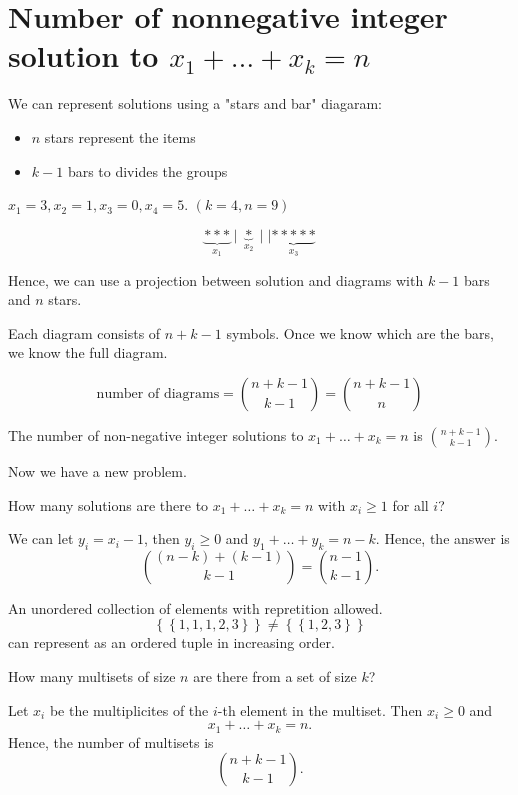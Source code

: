 \section{Number of nonnegative integer solution to \(x_1 + \dots + x_k = n\)}
We can represent solutions using a "stars and bar" diagaram:
\begin{itemize}
    \item \(n\) stars represent the items 
    \item \(k-1\) bars to divides the groups  
\end{itemize}
\begin{eg}
    \(x_1 = 3, x_2 = 1, x_3 = 0, x_4 = 5\). \((k=4, n=9)\)  
\end{eg}
\begin{explanation}
    \[
        \underbrace{* * *}_{x_1} \mid \underbrace{*}_{x_2} \mid \mid \underbrace{* * * * *}_{x_3}
    \]
\end{explanation}

Hence, we can use a projection between solution and diagrams with \(k-1\) bars and \(n\) stars. 

Each diagram consists of \(n + k - 1\) symbols. Once we know which are the bars, we know the full diagram. 

\[
    \text{number of diagrams} = \binom{n + k - 1}{k - 1} = \binom{n + k - 1}{n}
\]

\begin{proposition}
    The number of non-negative integer solutions to \(x_1 + \dots + x_k = n\) is \(\binom{n + k - 1}{k - 1}\). 
\end{proposition}
Now we have a new problem. 
\begin{question}
    How many solutions are there to \(x_1 + \dots + x_k = n\) with \(x_i \ge 1\) for all \(i\)?
\end{question}

We can let \(y_i = x_i - 1\), then \(y_i \ge 0\) and \(y_1 + \dots + y_k = n - k\). Hence, the answer is 
\[
    \binom{(n - k) + (k - 1)}{k-1} = \binom{n-1}{k-1}.
\]   

\begin{definition}[Multisets] \label{def: multiset}
    An unordered collection of elements with repretition allowed. 
    \[
        \left\{ \left\{ 1,1,1,2,3 \right\}  \right\} \neq \left\{ \left\{ 1,2,3 \right\}  \right\} 
    \] can represent as an ordered tuple in increasing order.
\end{definition}

\begin{eg}
    How many multisets of size \(n\) are there from a set of size \(k\)?  
\end{eg}
\begin{explanation}
    Let \(x_i\) be the multiplicites of the \(i\)-th element in the multiset. Then \(x_i \ge 0\) and 
    \[
        x_1 + \dots + x_k = n.
    \]   
    Hence, the number of multisets is 
    \[
        \binom{n + k - 1}{k - 1}.
    \]
\end{explanation}


